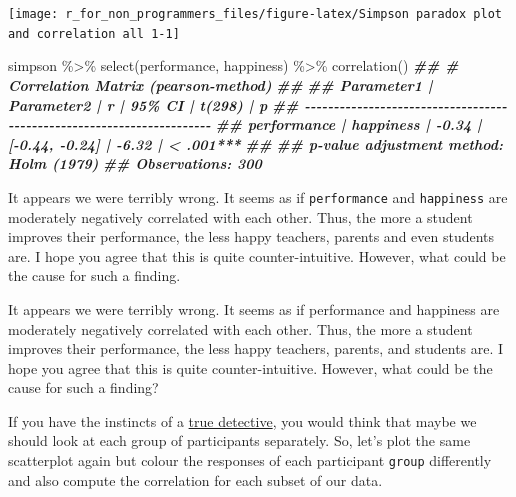 \documentclass[
]{book}
\newenvironment{Shaded}{\begin{snugshade}}{\end{snugshade}}
\newcommand{\DocumentationTok}[1]{\textcolor[rgb]{0.56,0.35,0.01}{\textbf{\textit{#1}}}}
\newcommand{\FunctionTok}[1]{\textcolor[rgb]{0.00,0.00,0.00}{#1}}
\newcommand{\NormalTok}[1]{#1}
\newcommand{\SpecialCharTok}[1]{\textcolor[rgb]{0.00,0.00,0.00}{#1}}
\begin{document}
\begin{center}\texttt{[image: r\_for\_non\_programmers\_files/figure-latex/Simpson paradox plot and correlation all 1-1]} \end{center}

\begin{Shaded}
\begin{Highlighting}[]
\NormalTok{simpson }\SpecialCharTok{\%\textgreater{}\%} 
  \FunctionTok{select}\NormalTok{(performance, happiness) }\SpecialCharTok{\%\textgreater{}\%} 
  \FunctionTok{correlation}\NormalTok{()}
\DocumentationTok{\#\# \# Correlation Matrix (pearson{-}method)}
\DocumentationTok{\#\# }
\DocumentationTok{\#\# Parameter1  | Parameter2 |     r |         95\% CI | t(298) |         p}
\DocumentationTok{\#\# {-}{-}{-}{-}{-}{-}{-}{-}{-}{-}{-}{-}{-}{-}{-}{-}{-}{-}{-}{-}{-}{-}{-}{-}{-}{-}{-}{-}{-}{-}{-}{-}{-}{-}{-}{-}{-}{-}{-}{-}{-}{-}{-}{-}{-}{-}{-}{-}{-}{-}{-}{-}{-}{-}{-}{-}{-}{-}{-}{-}{-}{-}{-}{-}{-}{-}{-}{-}{-}{-}}
\DocumentationTok{\#\# performance |  happiness | {-}0.34 | [{-}0.44, {-}0.24] |  {-}6.32 | \textless{} .001***}
\DocumentationTok{\#\# }
\DocumentationTok{\#\# p{-}value adjustment method: Holm (1979)}
\DocumentationTok{\#\# Observations: 300}
\end{Highlighting}
\end{Shaded}

It appears we were terribly wrong. It seems as if \texttt{performance} and \texttt{happiness} are moderately negatively correlated with each other. Thus, the more a student improves their performance, the less happy teachers, parents and even students are. I hope you agree that this is quite counter-intuitive. However, what could be the cause for such a finding.

It appears we were terribly wrong. It seems as if performance and happiness are moderately negatively correlated with each other. Thus, the more a student improves their performance, the less happy teachers, parents, and students are. I hope you agree that this is quite counter-intuitive. However, what could be the cause for such a finding?

If you have the instincts of a \href{https://www.imdb.com/title/tt2356777/episodes?season=1}{true detective}, you would think that maybe we should look at each group of participants separately. So, let's plot the same scatterplot again but colour the responses of each participant \texttt{group} differently and also compute the correlation for each subset of our data.
\end{document}
